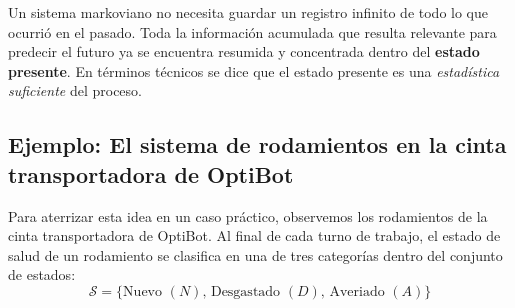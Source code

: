 \begin{ideaclave}
Un sistema markoviano no necesita guardar un registro infinito de todo lo que ocurrió en el pasado. Toda la información acumulada que resulta relevante para predecir el futuro ya se encuentra resumida y concentrada dentro del \textbf{estado presente}. En términos técnicos se dice que el estado presente es una \textit{estadística suficiente} del proceso.
\end{ideaclave}

\subsection*{Ejemplo: El sistema de rodamientos en la cinta transportadora de OptiBot}
Para aterrizar esta idea en un caso práctico, observemos los rodamientos de la cinta transportadora de OptiBot. Al final de cada turno de trabajo, el estado de salud de un rodamiento se clasifica en una de tres categorías dentro del conjunto de estados:
\begin{equation*}
  \mathcal{S} = \{ \text{Nuevo } (N), \, \text{Desgastado } (D), \, \text{Averiado } (A) \}
\end{equation*}

